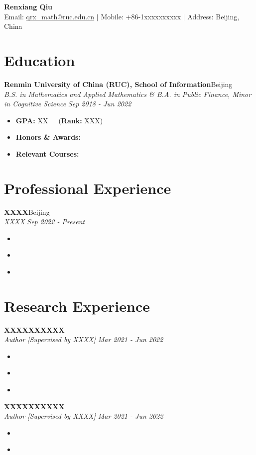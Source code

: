 \documentclass[10.5pt,a4paper]{extarticle}%
\newcommand{\resumeItemWithoutTitle}[1]{
  \vspace{-3pt}\item\small{
    {#1}\vspace{-5pt}
  }
}
\newcommand{\resumeHeading}[4]{
\textbf{#1}\hfill #2\\
  \textit{\small#3} \hfill \textit{\small #4} \\
}
\newcommand{\resumeItemListStart}{\begin{itemize}[leftmargin=*]\vspace{-5pt}}
\newcommand{\resumeItemListEnd}{\end{itemize}\vspace{-5pt}}
\begin{document}
\begin{center}
    \textbf{{\huge Renxiang Qiu}}\\
Email: \href{qrx_math@ruc.edu.cn}{qrx\_math@ruc.edu.cn} $\vert$ Mobile: +86-1xxxxxxxxxx $\vert$ Address: Beijing, China
\end{center}

\vspace{-10pt}

\section{Education}
    \resumeHeading
      {Renmin University of China (RUC), School of Information}{Beijing}
      {B.S. in Mathematics and Applied Mathematics \& B.A. in Public Finance, Minor in Cognitive Science}{Sep 2018 - Jun 2022}
      \resumeItemListStart
      \resumeItemWithoutTitle{\scriptsize  \footnotesize{\textbf{GPA: }XX~~~(\textbf{Rank: }XXX})}
      \resumeItemWithoutTitle{\scriptsize  \footnotesize{\textbf{Honors \& Awards:} \lipsum[66]}}
      \resumeItemWithoutTitle{\scriptsize  \footnotesize{\textbf{Relevant Courses:} \lipsum[66]}}
	 \resumeItemListEnd

\vspace{0pt}
\section{Professional Experience}
    \resumeHeading{XXXX}{Beijing}
    {XXXX}{Sep 2022 - Present}
    \resumeItemListStart
   \resumeItemWithoutTitle{\lipsum[66]}

    \resumeItemWithoutTitle{\lipsum[66]}
    \resumeItemWithoutTitle{\lipsum[75]}
    \resumeItemListEnd



\vspace{0pt}
\section{Research Experience}
    \resumeHeading{XXXXXXXXXX}{}
    {Author [Supervised by XXXX]}{Mar 2021 - Jun 2022}
    \resumeItemListStart
    \resumeItemWithoutTitle{\lipsum[66]}
    \resumeItemWithoutTitle{\lipsum[66]}
    \resumeItemWithoutTitle{\lipsum[66]}
    \resumeItemListEnd
    
    \resumeHeading{XXXXXXXXXX}{}
    {Author [Supervised by XXXX]}{Mar 2021 - Jun 2022}
    \resumeItemListStart
    \resumeItemWithoutTitle{\lipsum[75]}
    \resumeItemWithoutTitle{\lipsum[66]}
    \resumeItemListEnd
\end{document}
